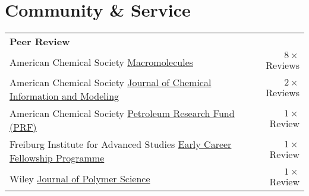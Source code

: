 \documentclass[letterpaper,11pt]{article}
\begin{document}
\section*{Community \& Service}
\vspace{-0.4\baselineskip}
\begin{longtable}{@{}p{}r@{}}
  \multicolumn{2}{l}{\hspace{-3mm} \bf{Peer Review}} 			                                                                                                                                                                                                                        \\ [4pt]
  \hspace{3mm} American Chemical Society \href{https://pubs.acs.org/journal/mamobx}{Macromolecules}                                                                                                               & $8\times$ Reviews                                                           \\ [3pt]
  \hspace{3mm} American Chemical Society \href{https://pubs.acs.org/journal/jcisd8}{Journal of Chemical Information and Modeling}                                                                                 & $2\times$ Reviews                                                           \\ [3pt]
  \hspace{3mm} American Chemical Society \href{https://www.acs.org/funding/grants/petroleum-research-fund.html}{Petroleum Research Fund (PRF)}                                                                    & $1\times$ Review                                                            \\ [3pt]
  \hspace{3mm} Freiburg Institute for Advanced Studies \href{https://www.frias.uni-freiburg.de/en/funding-programmes/frias-fellowships}{Early Career Fellowship Programme}                                        & $1\times$ Review                                                            \\ [3pt]
  \hspace{3mm} Wiley \href{https://onlinelibrary.wiley.com/journal/26424169}{Journal of Polymer Science}                                                                                                          & $1\times$ Review                                                            \\ [8pt]


\end{longtable}
\end{document}
